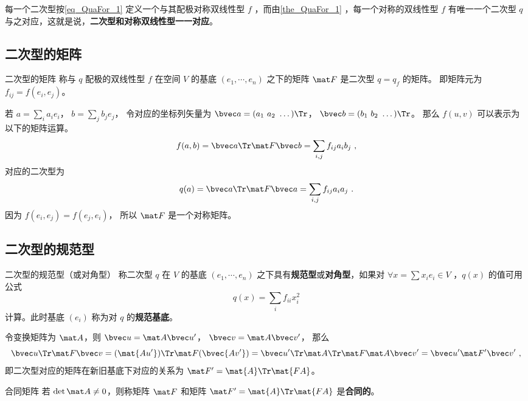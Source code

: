 每一个二次型按\autoref{eq_QuaFor_1} 定义一个与其配极对称双线性型 $f$ ，而由\autoref{the_QuaFor_1} ，每一个对称的双线性型 $f$ 有唯一一个二次型 $q$ 与之对应，这就是说，\textbf{二次型和对称双线性型一一对应}。

\subsection{二次型的矩阵}
\begin{definition}{二次型的矩阵}
称与 $q$ 配极的双线性型 $f$ 在空间 $V$ 的基底 $(e_1,\cdots,e_n)$ 之下的矩阵 $\mat F$ 是二次型 $q=q_f$ 的矩阵。 即矩阵元为 $f_{ij} = f(e_i, e_j)$。
\end{definition}

若 $a = \sum_i a_i e_i$， $b = \sum_j b_j e_j$， 令对应的坐标列矢量为 $\bvec a = (a_1\ a_2\ \dots)\Tr$， $\bvec b = (b_1\ b_2\ \dots)\Tr$。 那么 $f(u, v)$ 可以表示为以下的矩阵运算。
\begin{equation}
f(a, b) = \bvec a\Tr \mat F \bvec b = \sum_{i,j} f_{ij}a_i b_j~,
\end{equation}
对应的二次型为
\begin{equation}
q(a) = \bvec a\Tr \mat F \bvec a = \sum_{i,j} f_{ij}a_i a_j~.
\end{equation}
因为 $f(e_i, e_j) = f(e_j, e_i)$， 所以 $\mat F$ 是一个对称矩阵。

\subsection{二次型的规范型}
\begin{definition}{二次型的规范型（或对角型）}\label{def_QuaFor_1}
称二次型 $q$ 在 $V$ 的基底 $(e_1,\cdots,e_n)$ 之下具有\textbf{规范型}或\textbf{对角型}，如果对 $\forall x=\sum x_i e_i\in V$ ，$q(x)$ 的值可用公式
\begin{equation}
q(x)=\sum_{i}f_{ii}x_i^2
\end{equation}
计算。此时基底 $(e_i)$ 称为对 $q$ 的\textbf{规范基底}。
\end{definition}

令变换矩阵为 $\mat A$，则 $\bvec u = \mat A \bvec u'$， $\bvec v = \mat A \bvec v'$， 那么
\begin{equation}
\bvec u\Tr \mat F \bvec v = (\mat {Au'})\Tr \mat F (\bvec {Av'}) = {\bvec u'}\Tr \mat A\Tr\mat F \mat A \bvec v'=\bvec u'\mat F' \bvec v'~,
\end{equation}
即二次型对应的矩阵在新旧基底下对应的关系为 $\mat F'=\mat{A}\Tr \mat{FA}$。
\begin{definition}{合同矩阵}
若 $\det \mat A\neq 0$，则称矩阵 $\mat F$ 和矩阵 $\mat F'=\mat{A}\Tr \mat{FA}$ 是\textbf{合同的}。
\end{definition}
